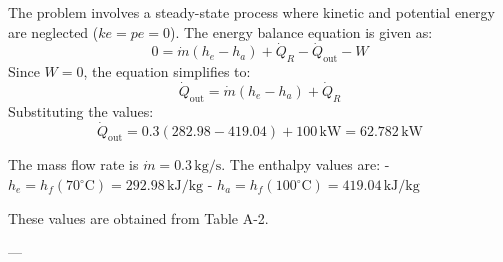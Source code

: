 The problem involves a steady-state process where kinetic and potential energy are neglected (\( ke = pe = 0 \)). The energy balance equation is given as:  
\[
0 = \dot{m}(h_e - h_a) + \dot{Q}_R - \dot{Q}_{\text{out}} - W
\]  
Since \( W = 0 \), the equation simplifies to:  
\[
\dot{Q}_{\text{out}} = \dot{m}(h_e - h_a) + \dot{Q}_R
\]  
Substituting the values:  
\[
\dot{Q}_{\text{out}} = 0.3 \left( 282.98 - 419.04 \right) + 100 \, \text{kW} = 62.782 \, \text{kW}
\]  

The mass flow rate is \( \dot{m} = 0.3 \, \text{kg/s} \). The enthalpy values are:  
- \( h_e = h_f(70^\circ\text{C}) = 292.98 \, \text{kJ/kg} \)  
- \( h_a = h_f(100^\circ\text{C}) = 419.04 \, \text{kJ/kg} \)  

These values are obtained from Table A-2.  

---
